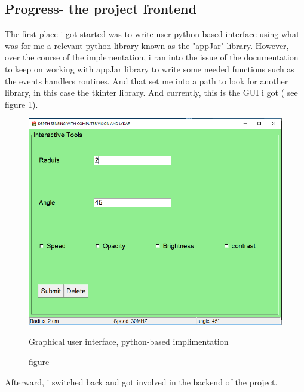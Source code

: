 \documentclass[10pt,draftclsnofoot,onecolumn,journal,compsoc]{IEEEtran}
\begin{document}
\begin{singlespace}
\subsection{Progress- the project frontend}
The first place i got started was to write user python-based interface using what was for me a relevant python library known as the "appJar" library. However, over the course of the implementation, i ran into the issue of the documentation to keep on  working with appJar library to write some needed functions such as the events handlers routines. And that set me into a path to look for another library, in this case the tkinter library. And currently, this is the GUI i got ( see figure 1).\\
    	\begin{figure}[ht]
    	 \centering \includegraphics[width=4.5in,natwidth=4000,natheight=200]{images/userinterface.png}
    	\caption{figure}{ Graphical user interface, python-based implimentation}\label{def:gui}
    	\end{figure}
    	
Afterward, i switched back and got involved in the backend of the project.


\end{singlespace}
\end{document}

